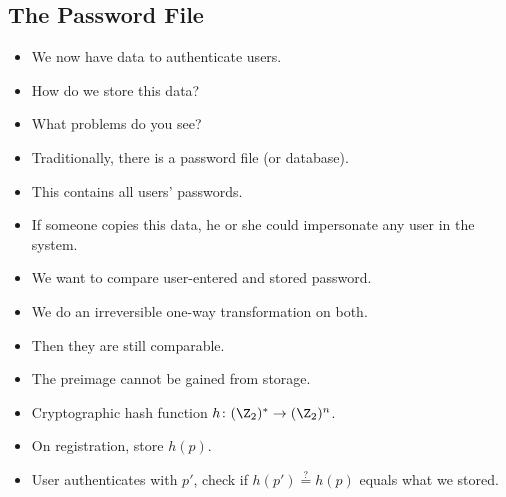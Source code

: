 \subsection{The Password File}

\begin{frame}
  \begin{exercise}
    \begin{itemize}
      \item We now have data to authenticate users.
      \item How do we store this data?
      \item What problems do you see?
    \end{itemize}
  \end{exercise}

  \pause{}

  \begin{example}
    \begin{itemize}
      \item Traditionally, there is a password file (or database).
      \item This contains all users' passwords.

        \pause{}

      \item If someone copies this data, he or she could impersonate any user 
        in the system.
    \end{itemize}
  \end{example}
\end{frame}

\begin{frame}
  \begin{solution}[Passwords]
    \begin{itemize}
      \item We want to compare user-entered and stored password.
      \item We do an irreversible one-way transformation on both.
      \item Then they are still comparable.
      \item The preimage cannot be gained from storage.
    \end{itemize}
  \end{solution}

  \pause{}

  \begin{example}
    \begin{itemize}
      \item Cryptographic hash function \(h\colon (\Z_2)^*\to (\Z_2)^n\).
      \item On registration, store \(h(p)\).
      \item User authenticates with \(p'\), check if \(h(p') \stackrel{?}{=}  
          h(p)\) equals what we stored.
    \end{itemize}
  \end{example}
\end{frame}


